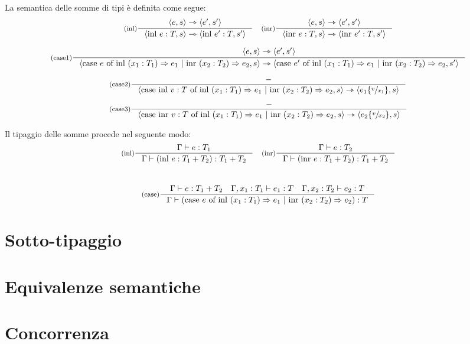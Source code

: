 \documentclass[a4paper, 11pt]{article}
\newcommand{\type}{\Gamma \vdash}
\newcommand{\subs}[3]{#1 \lbrace \sfrac{#2}{#3} \rbrace}
\newcommand{\goesto}{\rightarrowtriangle}
\begin{document}
La semantica delle somme di tipi è definita come segue: \begin{align*}
	\inference[(inl)]{\langle e,s \rangle \goesto \langle e',s' \rangle}{\langle \text{inl }e:T,s \rangle \goesto \langle \text{inl } e':T, s' \rangle} \quad \inference[(inr)]{\langle e,s \rangle \goesto \langle e',s' \rangle}{\langle \text{inr }e:T,s \rangle \goesto \langle \text{inr } e':T, s' \rangle}
\end{align*}
\begin{adjustwidth}{-1.5cm}{}
	\begin{align*}
	\inference[(case1)]{\langle e,s \rangle \goesto \langle e',s' \rangle}{\langle \text{case } e \text{ of inl }(x_1:T_1) \Rightarrow e_1\ |\ \text{inr } (x_2:T_2) \Rightarrow e_2, s \rangle \goesto \langle \text{case } e' \text{ of inl }(x_1:T_1) \Rightarrow e_1\ |\ \text{inr } (x_2:T_2) \Rightarrow e_2, s' \rangle}
	\end{align*}
\end{adjustwidth}
\newpage
\begin{align*}
	&\inference[(case2)]{-}{\langle \text{case inl } v:T \text{ of inl }(x_1:T_1) \Rightarrow e_1\ |\ \text{inr } (x_2:T_2) \Rightarrow e_2, s \rangle \goesto \langle \subs{e_1}{v}{x_1},s \rangle} \\ \\
	&\inference[(case3)]{-}{\langle \text{case inr } v:T \text{ of inl }(x_1:T_1) \Rightarrow e_1\ |\ \text{inr } (x_2:T_2) \Rightarrow e_2, s \rangle \goesto \langle \subs{e_2}{v}{x_2},s \rangle} \\
\end{align*}

Il tipaggio delle somme procede nel seguente modo: 
\[
	\inference[(inl)]{\type e:T_1}{\type (\text{inl } e:T_1+T_2):T_1+T_2} \quad \inference[(inr)]{\type e:T_2}{\type (\text{inr } e:T_1+T_2):T_1+T_2} 
\]
\\
\[
	\inference[(case)]{\type e:T_1+T_2 \quad \Gamma, x_1: T_1 \vdash e_1:T \quad \Gamma, x_2: T_2 \vdash e_2:T}{\type (\text{case } e \text{ of inl }(x_1:T_1) \Rightarrow e_1\ |\ \text{inr } (x_2:T_2) \Rightarrow e_2):T}
\]






\section{Sotto-tipaggio}

\section{Equivalenze semantiche}

\section{Concorrenza}
\end{document}
